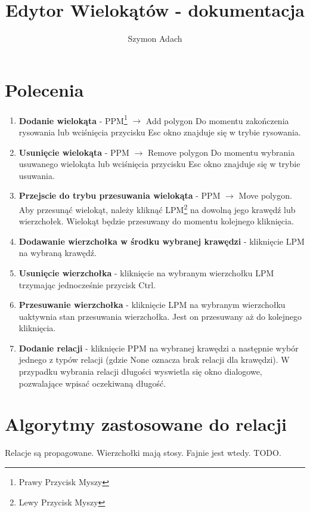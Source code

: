 \documentclass[]{article}
\title{Edytor Wielokątów - dokumentacja}
\author{Szymon Adach}
\begin{document}
\maketitle

\section{Polecenia}
\begin{enumerate}
	\item \textbf{Dodanie wielokąta} - PPM\footnote{Prawy Przycisk Myszy} $\rightarrow$ Add polygon \newline
	Do momentu zakończenia rysowania lub wciśnięcia przycisku Esc okno znajduje się w trybie rysowania.
	\item \textbf{Usunięcie wielokąta} - PPM $\rightarrow$ Remove polygon
	Do momentu wybrania usuwanego wielokąta lub wciśnięcia przycisku Esc okno znajduje się w trybie usuwania.
	\item \textbf{Przejscie do trybu przesuwania wielokąta} - PPM $\rightarrow$ Move polygon. \newline
	Aby przesunąć wielokąt, należy kliknąć LPM\footnote{Lewy Przycisk Myszy} na dowolną jego krawędź lub wierzchołek. Wielokąt będzie przesuwany do momentu kolejnego kliknięcia.
	\item \textbf{Dodawanie wierzchołka w środku wybranej krawędzi} - kliknięcie LPM na wybraną krawędź.
	\item \textbf{Usunięcie wierzchołka} - kliknięcie na wybranym wierzchołku LPM trzymając jednocześnie przycisk Ctrl.
	\item \textbf{Przesuwanie wierzchołka} - kliknięcie LPM na wybranym wierzchołku uaktywnia stan przesuwania wierzchołka. Jest on przesuwany aż do kolejnego kliknięcia.
	\item \textbf{Dodanie relacji} - kliknięcie PPM na wybranej krawędzi a następnie wybór jednego z typów relacji (gdzie None oznacza brak relacji dla krawędzi). W przypadku wybrania relacji długości wyswietla się okno dialogowe, pozwalające wpisać oczekiwaną długość.
\end{enumerate}
\section{Algorytmy zastosowane do relacji}
Relacje są propagowane. Wierzchołki mają stosy. Fajnie jest wtedy. TODO.
\end{document}
